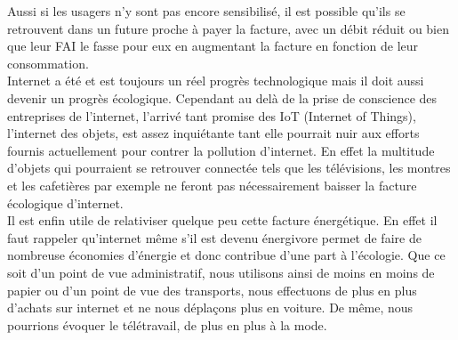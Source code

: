 \documentclass[a4paper,twocolumn,12pt]{article}
\begin{document}
	Aussi si les usagers n’y sont pas encore sensibilisé, il est possible qu’ils se retrouvent dans un future proche à payer la facture, avec un débit réduit ou bien que leur FAI le fasse pour eux en augmentant la facture en fonction de leur consommation. \\

	Internet a été et est toujours un réel progrès technologique mais il doit aussi devenir un progrès écologique. Cependant au delà de la prise de conscience des entreprises de l'internet, l’arrivé tant promise des IoT (Internet of Things), l’internet des objets, est assez inquiétante tant elle pourrait nuir aux efforts fournis actuellement pour contrer la pollution d’internet. En effet la multitude d’objets qui pourraient se retrouver connectée tels que les télévisions, les montres et les cafetières par exemple ne feront pas nécessairement baisser la facture écologique d’internet. \\
	
	Il est enfin utile de relativiser quelque peu cette facture énergétique. En effet il faut rappeler qu'internet même s'il est devenu énergivore permet de faire de nombreuse économies d'énergie et donc contribue d'une part à l'écologie. Que ce soit d'un point de vue administratif, nous utilisons ainsi de moins en moins de papier ou d'un point de vue des transports, nous effectuons de plus en plus d'achats sur internet et ne nous déplaçons plus en voiture. De même, nous pourrions évoquer le télétravail, de plus en plus à la mode.



\end{document}
